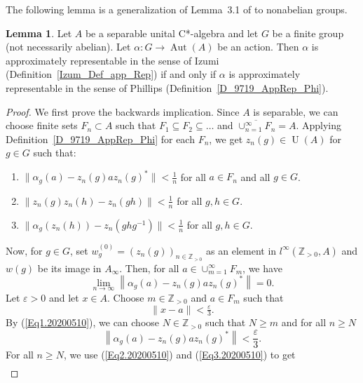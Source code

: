 \documentclass[10pt]{amsart}
\numberwithin{equation}{section}
\theoremstyle{definition}
\newtheorem{lem}[thm]{Lemma}
\newcommand{\af}{\alpha}
\newcommand{\ep}{\varepsilon}
\newcommand{\N}{{\mathbb{Z}}_{> 0}}
\newcommand{\Aut}{{\operatorname{Aut}}}
\newcommand{\U}{{\operatorname{U}}}
\begin{document}
The following lemma is a generalization of Lemma~3.1 of \cite{Ph11} to nonabelian groups.
\begin{lem}\label{Lem.PZ.20200623}
Let $A$ be a separable unital C*-algebra and let $G$ be a finite group (not necessarily abelian).
Let $\alpha \colon G \to \Aut (A)$ be an action.
Then $\alpha$ is approximately representable in the sense of Izumi (Definition~\ref{Izum_Def_app_Rep}) if and only if
$\alpha$ is approximately representable in the sense of Phillips (Definition~\ref{D_9719_AppRep_Phi}).
\end{lem}
%
\begin{proof}
We first prove the backwards implication. Since $A$ is separable, 
we can choose finite sets $F_n \subset A$ such that
$F_1 \subseteq F_2 \subseteq \ldots$ and $\overline{\cup_{n=1}^{\infty} F_n} = A$.
Applying  Definition~\ref{D_9719_AppRep_Phi} for each $F_n$, we get 
 $z_{n}(g) \in \U (A)$ for $g \in G$ such that:
\begin{enumerate}
\item \label{D_9719_AppRep.1'}
$\| \af_g (a) - z_{n}(g) a z_{n}(g)^* \| < \frac{1}{n}$ for all $a \in F_n$ and all $g \in G$.
\item \label{D_9719_AppRep.2'}
$\| z_{n}(g) z_{n}(h) - z_{n}(gh)\| < \frac{1}{n}$ for all $g, h \in G$.
\item \label{D_9719_AppRep.3'}
 $\| \af_g (z_{n}(h)) - z_{n}(g h g^{-1})\| < \frac{1}{n}$ for all $g, h \in G$.
\end{enumerate}
Now, for $g \in G$, set $w^{(0)}_{ g}= (z_{n}(g))_{n\in \N}$ as an element in $l^{\infty} (\N, A)$
and $w(g)$ be its image in $A_{\infty}$.
Then, for all $a \in \cup_{m=1}^{\infty} F_m$, we have
\begin{equation} \label{Eq1.20200510}
\lim_{n \to \infty}
 \left\| \alpha_{g} (a) - z_{n}(g) a z_{n}(g)^*\right\|=0.
\end{equation}
Let $\ep>0$ and let $x \in A$. Choose $m \in \N$ and $a \in F_m$ such that 
\begin{equation}  \label{Eq2.20200510}
\|x - a \|<\tfrac{\ep}{3}.
\end{equation}
By (\ref{Eq1.20200510}), we can choose $N \in \N$ such that $N \geq m$ and for all $n \geq N$
\begin{equation} \label{Eq3.20200510}
\left\| \alpha_{g} (a) - z_{n}(g) a z_{n}(g)^*\right\| < \frac{\ep}{3}.
\end{equation}
For all $n \geq N$, we use (\ref{Eq2.20200510}) and (\ref{Eq3.20200510}) to get
\begin{align*}

\end{align*}
\end{proof}
\end{document}
